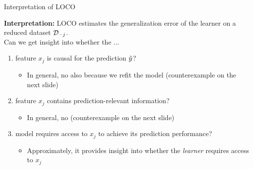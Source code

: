\documentclass[11pt,compress,t,notes=noshow, aspectratio=169, xcolor=table]{beamer}
\begin{document}
\begin{frame}{Interpretation of LOCO}

\textbf{Interpretation:} LOCO estimates the generalization error of the learner on a reduced dataset $\D_{-j}$.\\
\lz
Can we get insight into whether the ...
\begin{enumerate}
    \item feature $x_j$ is causal for the prediction $\yh$?
    \begin{itemize}
      \item In general, no also because we refit the model (counterexample on the next slide)
    \end{itemize}
    \item feature $x_j$ contains prediction-relevant information?
    \begin{itemize}
      \item In general, no (counterexample on the next slide)
    \end{itemize}
    \item model requires access to $x_j$ to achieve its prediction performance?
    \begin{itemize}
      \item Approximately, it provides insight into whether the \textit{learner} requires access to $x_j$
    \end{itemize}
\end{enumerate}
\end{frame}
\end{document}
